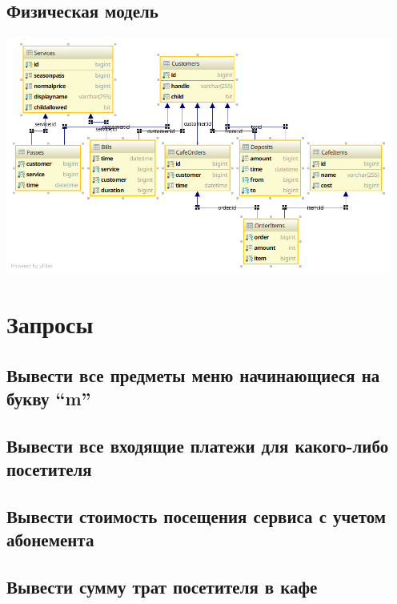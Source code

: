\documentclass[a4paper]{article}
\begin{document}
\subsection{Физическая модель}
\includegraphics[width=5in]{img/db.png}

\section{Запросы}


\subsection{Вывести все предметы меню начинающиеся на букву ``m''}


\subsection{Вывести все входящие платежи для какого-либо посетителя}


\subsection{Вывести стоимость посещения сервиса с учетом абонемента}


\subsection{Вывести сумму трат посетителя в кафе}

\end{document}
